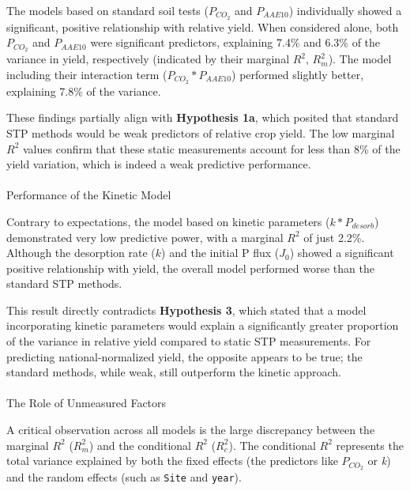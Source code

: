 \documentclass[
  a4paper,
]{article}
\makeatletter
\let\oldparagraph\paragraph
\renewcommand{\paragraph}{
    \@ifstar
      \xxxParagraphStar
      \xxxParagraphNoStar
  }
\newcommand{\xxxParagraphStar}[1]{\oldparagraph*{#1}\mbox{}}
\newcommand{\xxxParagraphNoStar}[1]{\oldparagraph{#1}\mbox{}}
\makeatother
\begin{document}
The models based on standard soil tests (\(P_{CO_2}\) and \(P_{AAE10}\))
individually showed a significant, positive relationship with relative
yield. When considered alone, both \(P_{CO_2}\) and \(P_{AAE10}\) were
significant predictors, explaining 7.4\% and 6.3\% of the variance in
yield, respectively (indicated by their marginal \(R^2\), \(R^2_m\)).
The model including their interaction term (\(P_{CO_2}*P_{AAE10}\))
performed slightly better, explaining 7.8\% of the variance.

These findings partially align with \textbf{Hypothesis 1a}, which
posited that standard STP methods would be weak predictors of relative
crop yield. The low marginal \(R^2\) values confirm that these static
measurements account for less than 8\% of the yield variation, which is
indeed a weak predictive performance.

\paragraph{Performance of the Kinetic
Model}\label{performance-of-the-kinetic-model}

Contrary to expectations, the model based on kinetic parameters
(\(k * P_{desorb}\)) demonstrated very low predictive power, with a
marginal \(R^2\) of just 2.2\%. Although the desorption rate (\(k\)) and
the initial P flux (\(J_0\)) showed a significant positive relationship
with yield, the overall model performed worse than the standard STP
methods.

This result directly contradicts \textbf{Hypothesis 3}, which stated
that a model incorporating kinetic parameters would explain a
significantly greater proportion of the variance in relative yield
compared to static STP measurements. For predicting national-normalized
yield, the opposite appears to be true; the standard methods, while
weak, still outperform the kinetic approach.

\paragraph{The Role of Unmeasured
Factors}\label{the-role-of-unmeasured-factors}

A critical observation across all models is the large discrepancy
between the marginal \(R^2\) (\(R^2_m\)) and the conditional \(R^2\)
(\(R^2_c\)). The conditional \(R^2\) represents the total variance
explained by both the fixed effects (the predictors like \(P_{CO_2}\) or
\emph{k}) and the random effects (such as \texttt{Site} and
\texttt{year}).
\end{document}
